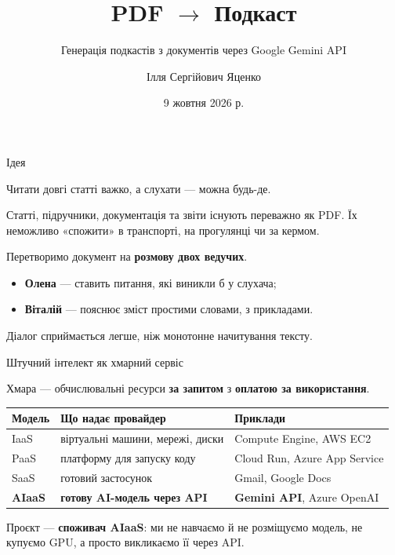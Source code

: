 \documentclass[aspectratio=43]{beamer}
\title[PDF $\to$ Подкаст]{PDF $\to$ Подкаст}
\subtitle{Генерація подкастів з документів через Google Gemini API}
\author[І.С. Яценко]{Ілля Сергійович Яценко}
\institute[КНУТШ]{
  Кафедра теоретичної кібернетики \\
  Факультет комп'ютерних наук та кібернетики \\
  Київський національний університет імені Тараса Шевченка
}
\date{9 жовтня 2026 р.}
\newcommand{\thesis}[1]{\begin{block}{}#1\end{block}}
\begin{document}
\begin{frame}
  \titlepage
\end{frame}

\begin{frame}{Ідея}
  \thesis{Читати довгі статті важко, а слухати --- можна будь-де.}

  Статті, підручники, документація та звіти існують переважно як PDF.
  Їх неможливо «спожити» в транспорті, на прогулянці чи за кермом.

  \thesis{Перетворимо документ на \textbf{розмову двох ведучих}.}
  \begin{itemize}
    \item \textbf{Олена} --- ставить питання, які виникли б у слухача;
    \item \textbf{Віталій} --- пояснює зміст простими словами, з прикладами.
  \end{itemize}
  Діалог сприймається легше, ніж монотонне начитування тексту.
\end{frame}

\begin{frame}{Штучний інтелект як хмарний сервіс}
  \thesis{Хмара --- обчислювальні ресурси \textbf{за запитом} з
    \textbf{оплатою за використання}.}

  \small
  \begin{tabular}{@{}lll@{}}
    \toprule
    Модель & Що надає провайдер & Приклади \\
    \midrule
    IaaS & віртуальні машини, мережі, диски & Compute Engine, AWS EC2 \\
    PaaS & платформу для запуску коду & Cloud Run, Azure App Service \\
    SaaS & готовий застосунок & Gmail, Google Docs \\
    \textbf{AIaaS} & \textbf{готову AI-модель через API} & \textbf{Gemini API}, Azure OpenAI \\
    \bottomrule
  \end{tabular}
  \normalsize

  \thesis{Проєкт --- \textbf{споживач AIaaS}: ми не навчаємо й не
    розміщуємо модель, не купуємо GPU, а просто викликаємо її через API.}
\end{frame}
\end{document}
